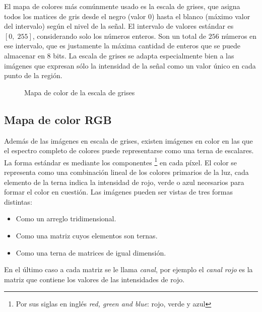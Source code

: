 El mapa de colores más comúnmente usado es la escala de grises, que asigna todos los matices de gris desde el negro (valor $0$) hasta el blanco (máximo valor del intervalo) según el nivel de la señal. El intervalo de valores estándar es $[0,\; 255]$, considerando solo los n\'umeros enteros. Son un total de $256$ n\'umeros en ese intervalo, que es justamente la m\'axima cantidad de enteros que se puede almacenar en 8 bits. La escala de grises se adapta especialmente bien a las imágenes que expresan sólo la intensidad de la señal como un valor único en cada punto de la región.
\begin{figure}[h]
	\centering
	\caption{Mapa de color de la escala de grises}
\end{figure}

\subsection{Mapa de color RGB}

Además de las imágenes en escala de grises, existen imágenes en color en las que el espectro completo de colores puede representarse como una terna de escalares. La forma est\'andar es mediante los componentes \RGB\footnote{Por sus siglas en ingl\'es \textit{red, green and blue}: rojo, verde y azul} en cada píxel. El color se representa como una combinación lineal de los colores primarios de la luz, cada elemento de la terna indica la intensidad de rojo, verde o azul necesarios para formar el color en cuesti\'on. Las im\'agenes \RGB pueden ser vistas de tres formas distintas:
\begin{itemize}
	\item Como un arreglo tridimensional.
	\item Como una matriz cuyos elementos son ternas.
	\item Como una terna de matrices de igual dimensi\'on.
\end{itemize}
En el \'ultimo caso a cada matriz se le llama \textit{canal}, por ejemplo el \textit{canal rojo} es la matriz que contiene los valores de las intensidades de rojo.

